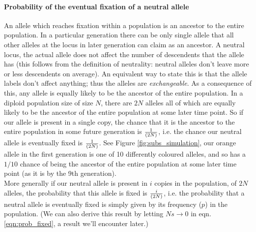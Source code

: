 \paragraph{Probability of the eventual fixation of a neutral allele}
An allele which reaches fixation within a population is an ancestor to the
entire population. In a particular generation there can be only single allele
that all other alleles at the locus in later generation can claim as an
ancestor. A neutral locus, the actual allele does not affect the number of
descendents that the allele has (this follows from the definition of
neutrality: neutral alleles don't leave more or less descendents on average).
An equivalent way to state this is that the allele labels don't affect
anything; thus the alleles are \emph{exchangeable}. As a consequence of this,
any allele is equally likely to be the ancestor of the entire population.  In a
diploid population size of size $N$, there are $2N$ alleles all of which are
equally likely to be the ancestor of the entire population at some later time
point. So if our allele is present in a single copy, the chance that it is the
ancestor to the entire population in some future generation is
$\nicefrac{1}{(2N)}$, i.e. the chance our neutral allele is eventually fixed is
$\nicefrac{1}{(2N)}$.  See Figure \ref{fig:subs_simulation}, our orange allele
in the first generation is one of 10 differently coloured alleles, and so has a
$1/10$ chance of being the ancestor of the entire population at some later time
point (as it is by the 9th generation).\\

More generally if our neutral allele is present in $i$ copies in the
population, of $2N$ alleles, the probability that this allele is fixed is
$\nicefrac{i}{(2N)}$, i.e. the probability that a neutral allele is eventually
fixed is simply given by its frequency ($p$) in the population.  (We can also
derive this result by letting $Ns \rightarrow 0$ in eqn.
\eqref{eqn:prob_fixed}, a result we'll encounter later.)


